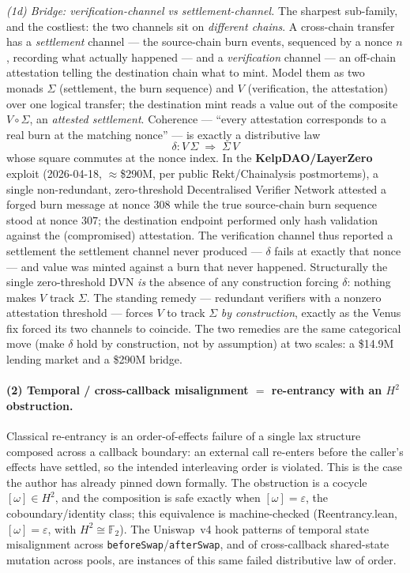 \documentclass[11pt]{amsart}
\theoremstyle{definition}
\theoremstyle{remark}
\newcommand{\FF}{\mathbb{F}_2}
\begin{document}
\emph{(1d) Bridge: verification-channel vs settlement-channel.} The sharpest sub-family, and the
costliest: the two channels sit on \emph{different chains}. A cross-chain transfer has a
\emph{settlement} channel --- the source-chain burn events, sequenced by a nonce $n$, recording
what actually happened --- and a \emph{verification} channel --- an off-chain attestation telling
the destination chain what to mint. Model them as two monads $\Sigma$ (settlement, the burn
sequence) and $V$ (verification, the attestation) over one logical transfer; the destination mint
reads a value out of the composite $V\circ\Sigma$, an \emph{attested settlement}. Coherence ---
``every attestation corresponds to a real burn at the matching nonce'' --- is exactly a
distributive law
\[
  \delta : V\,\Sigma \;\Longrightarrow\; \Sigma\,V
\]
whose square commutes at the nonce index. In the \textbf{KelpDAO/LayerZero} exploit (2026-04-18,
$\approx$\$290M, per public Rekt/Chainalysis postmortems), a single non-redundant, zero-threshold
Decentralised Verifier Network attested a forged burn message at nonce $308$ while the true
source-chain burn sequence stood at nonce $307$; the destination endpoint performed only hash
validation against the (compromised) attestation. The verification channel thus reported a
settlement the settlement channel never produced --- $\delta$ fails at exactly that nonce --- and
value was minted against a burn that never happened. Structurally the single zero-threshold DVN
\emph{is} the absence of any construction forcing $\delta$: nothing makes $V$ track $\Sigma$. The
standing remedy --- redundant verifiers with a nonzero attestation threshold --- forces $V$ to
track $\Sigma$ \emph{by construction}, exactly as the Venus fix forced its two channels to
coincide. The two remedies are the same categorical move (make $\delta$ hold by construction, not
by assumption) at two scales: a \$14.9M lending market and a \$290M bridge.

\paragraph{(2) Temporal / cross-callback misalignment $=$ re-entrancy with an $H^2$ obstruction.}
Classical re-entrancy is an order-of-effects failure of a single lax structure composed across a
callback boundary: an external call re-enters before the caller's effects have settled, so the
intended interleaving order is violated. This is the case the author has already pinned down
formally. The obstruction is a cocycle $[\omega]\in H^2$, and the composition is safe exactly
when $[\omega]=\varepsilon$, the coboundary/identity class; this equivalence is machine-checked
(\textsf{Reentrancy.lean}, $[\omega]=\varepsilon$, with $H^2\cong\FF$). The Uniswap~v4 hook
patterns of temporal state misalignment across \texttt{beforeSwap}/\texttt{afterSwap}, and of
cross-callback shared-state mutation across pools, are instances of this same failed distributive
law of order.
\end{document}
